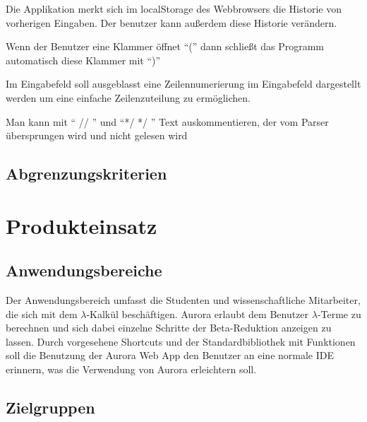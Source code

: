\documentclass[parskip=full,11pt,twoside]{scrartcl}
\begin{document}

Die Applikation merkt sich im localStorage des Webbrowsers die Historie von vorherigen Eingaben. Der benutzer kann außerdem diese Historie verändern.



Wenn der Benutzer eine Klammer öffnet \enquote{(} dann schließt das Programm automatisch diese Klammer mit \enquote{)}

Im Eingabefeld soll ausgeblasst eine Zeilennumerierung im Eingabefeld dargestellt werden um eine einfache Zeilenzuteilung zu ermöglichen.

Man kann mit \enquote{ // } und \enquote{*/ */ }  Text auskommentieren, der vom Parser übersprungen wird und nicht gelesen wird

\subsection{Abgrenzungskriterien}


\pagebreak
\section{Produkteinsatz}
\subsection{Anwendungsbereiche}

Der Anwendungsbereich umfasst die Studenten und wissenschaftliche Mitarbeiter, die sich mit dem $\lambda$-Kalkül beschäftigen. Aurora erlaubt dem Benutzer $\lambda$-Terme zu berechnen und sich dabei einzelne Schritte der Beta-Reduktion anzeigen zu lassen. Durch vorgesehene Shortcuts und der Standardbibliothek mit Funktionen soll die Benutzung  der Aurora Web App den Benutzer an eine normale IDE erinnern, was die Verwendung von Aurora erleichtern soll.

\subsection{Zielgruppen}
\end{document}
